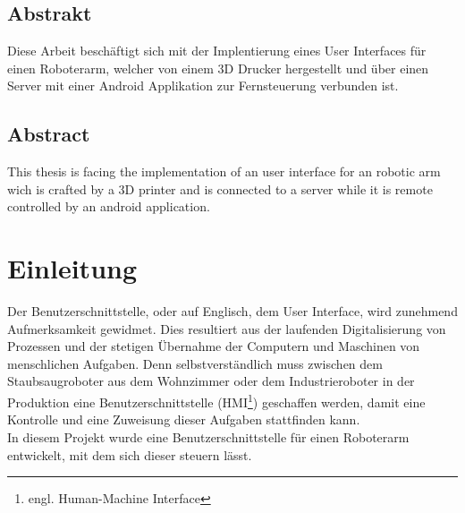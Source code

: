 \documentclass[12pt,					%
							 oneside,			%
							 a4paper,			%
							 halfparskip,		%
							 liststotoc,			%
							 bibtotoc,			%
							 fleqn,				%
							 pointlessnumbers]	%
							 {scrreprt}
\begin{document}
\begin{titlepage}
\begin{center}
\begin{table}[b]
\begin{tabular}{rl}
				\end{tabular}
			\end{table}
		\end{center}
	\end{titlepage}

	\onehalfspacing 					%
	

	
\section*{Abstrakt}
Diese Arbeit beschäftigt sich mit der Implentierung eines User Interfaces für einen Roboterarm, welcher von einem 3D Drucker hergestellt und über einen Server mit einer Android Applikation zur Fernsteuerung verbunden ist.
\section*{Abstract}
This thesis is facing the implementation of an user interface for an robotic arm wich is crafted by a 3D printer and is connected to a server while it is remote controlled by an android application.
\tableofcontents
{} 					%

\chapter{Einleitung}
Der Benutzerschnittstelle, oder auf Englisch, dem \glqq{}User Interface\grqq{}, wird zunehmend Aufmerksamkeit gewidmet. Dies resultiert aus der laufenden Digitalisierung von Prozessen und der stetigen Übernahme der Computern und Maschinen von menschlichen Aufgaben. Denn selbstverständlich muss zwischen dem Staubsaugroboter aus dem Wohnzimmer oder dem Industrieroboter in der Produktion eine  Benutzerschnittstelle (HMI\footnote{engl. Human-Machine Interface}) geschaffen werden, damit eine Kontrolle und eine Zuweisung dieser Aufgaben stattfinden kann. \\
In diesem Projekt wurde eine Benutzerschnittstelle für einen Roboterarm entwickelt, mit dem sich dieser steuern lässt. 
\end{document}
